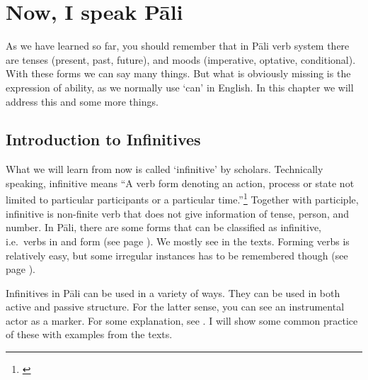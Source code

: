 \chapter{Now, I  speak P\=ali}\label{chap:inf}

As we have learned so far, you should remember that in P\=ali verb system there are tenses (present, past, future), and moods (imperative, optative, conditional). With these forms we can say many things. But what is obviously missing is the expression of ability, as we normally use `can' in English. In this chapter we will address this and some more things.

{}
\section*{Introduction to Infinitives}

What we will learn from now is called `infinitive' by scholars. Technically speaking, infinitive means ``A verb form denoting an action, process or state not limited to particular participants or a particular time.''\footnote{\citealp[p.~227]{brownmiller:dict}} Together with participle, infinitive is non-finite verb that does not give information of tense, person, and number. In P\=ali, there are some  forms that can be classified as infinitive, i.e.\ verbs in  and  form (see page \pageref{par:kitatum}). We mostly see  in the texts. Forming  verbs is relatively easy, but some irregular instances has to be remembered though (see page \pageref{sec:irrprod}).

Infinitives in P\=ali can be used in a variety of ways. They can be used in both active and passive structure. For the latter sense, you can see an instrumental actor as a marker. For some explanation, see \citealp[pp.~134--6]{warder:intro}. I will show some common practice of these with examples from the texts.

